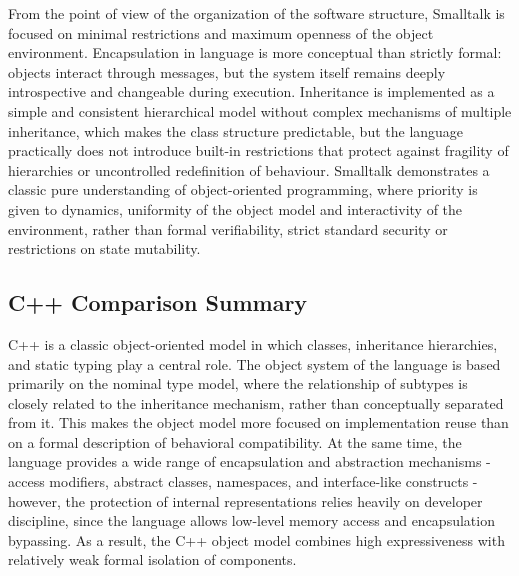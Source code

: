 From the point of view of the organization of the software structure, Smalltalk is focused on minimal restrictions and maximum openness of the object environment. Encapsulation in language is more conceptual than strictly formal: objects interact through messages, but the system itself remains deeply introspective and changeable during execution. Inheritance is implemented as a simple and consistent hierarchical model without complex mechanisms of multiple inheritance, which makes the class structure predictable, but the language practically does not introduce built-in restrictions that protect against fragility of hierarchies or uncontrolled redefinition of behaviour. Smalltalk demonstrates a classic pure understanding of object-oriented programming, where priority is given to dynamics, uniformity of the object model and interactivity of the environment, rather than formal verifiability, strict standard security or restrictions on state mutability.

\subsection{C++ Comparison Summary}

C++ is a classic object-oriented model in which classes, inheritance hierarchies, and static typing play a central role. The object system of the language is based primarily on the nominal type model, where the relationship of subtypes is closely related to the inheritance mechanism, rather than conceptually separated from it. This makes the object model more focused on implementation reuse than on a formal description of behavioral compatibility. At the same time, the language provides a wide range of encapsulation and abstraction mechanisms - access modifiers, abstract classes, namespaces, and interface-like constructs - however, the protection of internal representations relies heavily on developer discipline, since the language allows low-level memory access and encapsulation bypassing. As a result, the C++ object model combines high expressiveness with relatively weak formal isolation of components.

